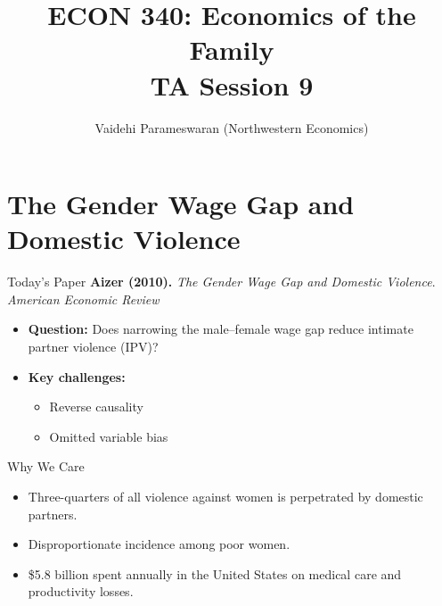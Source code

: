 \documentclass[11pt,notes=hide,aspectratio=169,mathserif]{beamer}
\title[class]{ECON 340: Economics of the Family \\ TA Session 9}
\author[Vaidehi's class]{Vaidehi Parameswaran (Northwestern Economics)}
\date{\monthname[\the\month] \the\year}
\begin{document}
\begin{frame}[plain]
\titlepage
\end{frame}


\section{The Gender Wage Gap and Domestic Violence}

\begin{frame}{Today's Paper}
\small
\textbf{Aizer (2010).} \emph{The Gender Wage Gap and Domestic Violence}. \textit{American Economic Review} \\[0.6em]
\begin{itemize}
  \item \textbf{Question:} Does narrowing the male--female wage gap reduce intimate partner violence (IPV)?
  \item \textbf{Key challenges:}
    \begin{itemize}
        \item Reverse causality
        \item Omitted variable bias
    \end{itemize}
\end{itemize}
\end{frame}

\begin{frame}{Why We Care}
\begin{itemize}
  \item Three-quarters of all violence against women is perpetrated by domestic partners.
  \item Disproportionate incidence among poor women.
  \item \$5.8 billion spent annually in the United States on medical care and productivity losses.
\end{itemize}
\end{frame}
\end{document}
